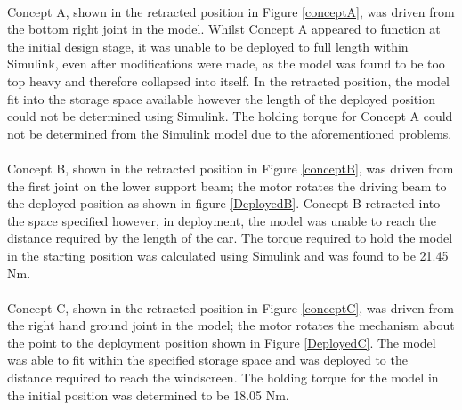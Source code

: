 \documentclass[a4paper]{article}
\begin{document}
\paragraph{}
Concept A, shown in the retracted position in Figure \ref{conceptA}, was driven from the bottom right joint in the model. Whilst Concept A appeared to function at the initial design stage, it was unable to be deployed to full length within Simulink, even after modifications were made, as the model was found to be too top heavy and therefore collapsed into itself. In the retracted position, the model fit into the storage space available however the length of the deployed position could not be determined using Simulink. The holding torque for Concept A could not be determined from the Simulink model due to the aforementioned problems.

\paragraph{}
Concept B, shown in the retracted position in Figure \ref{conceptB},  was driven from the first joint on the lower support beam; the motor rotates the driving beam to the deployed position as shown in figure \ref{DeployedB}. Concept B retracted into the space specified however, in deployment, the model was unable to reach the distance required by the length of the car. The torque required to hold the model in the starting position was calculated using Simulink and was found to be 21.45 Nm. 

\paragraph{}
Concept C, shown in the retracted position in Figure \ref{conceptC}, was driven from the right hand ground joint in the model; the motor rotates the mechanism about the point to the deployment position shown in Figure \ref{DeployedC}. The model was able to fit within the specified storage space and was deployed to the distance required to reach the windscreen. The holding torque for the model in the initial position was determined to be 18.05 Nm.
\end{document}
